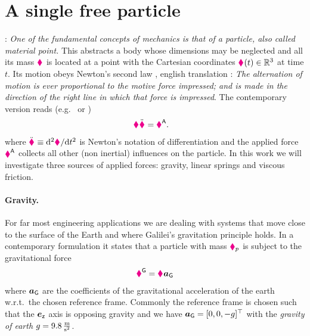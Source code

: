 \section{A single free particle}
\cite[§1]{Landau:Mechanics}: \textit{One of the fundamental concepts of mechanics is that of a \textit{particle}, also called material point.}
This abstracts a body whose dimensions may be neglected and all its mass $\textcolor{magenta}{\blacklozenge}_{}$ is located at a point with the Cartesian coordinates $\boldsymbol{\textcolor{magenta}{\blacklozenge}}_{}(t)\in\mathbb{R}^3$ at time $t$.
Its motion obeys Newton's second law \cite[p.\ 13, lex II]{Newton:Principia}, english translation \cite[p.\ 83]{Newton:PrincipiaEnglish}: \textit{The alternation of motion is ever proportional to the motive force impressed; and is made in the direction of the right line in which that force is impressed}. 
The contemporary version reads (e.g.\ \cite[eq.\ 6.1.1]{Lurie:AnalyticalMechanics} or \cite[eq.\ 1.3]{Goldstein:ClassicalMechanics})
\begin{align}\label{eq:NewtonsSecondLaw}
 \textcolor{magenta}{\blacklozenge}_{} \ddot{\boldsymbol{\textcolor{magenta}{\blacklozenge}}}_{} &= \boldsymbol{\textcolor{magenta}{\blacklozenge}}_{}^{\mathsf{A}}.
\end{align}
where $\ddot{\boldsymbol{\textcolor{magenta}{\blacklozenge}}}_{} \equiv \mathrm{d}^2 \boldsymbol{\textcolor{magenta}{\blacklozenge}}_{} / \mathrm{d} t^2$ is Newton's notation of differentiation and the applied force $\boldsymbol{\textcolor{magenta}{\blacklozenge}}_{}^{\mathsf{A}}$ collects all other (non inertial) influences on the particle.
In this work we will investigate three sources of applied forces: gravity, linear springs and viscous friction.

\paragraph{Gravity.}
For far most engineering applications we are dealing with systems that move close to the surface of the Earth and where Galilei's gravitation principle \cite[Day 3]{Galileo:TwoNewSciences} holds.
In a contemporary formulation it states that a particle with mass $\textcolor{magenta}{\blacklozenge}_{p}$ is subject to the gravitational force
\begin{align}\label{eq:ParticleGravity}
 \boldsymbol{\textcolor{magenta}{\blacklozenge}}_{}^{\mathsf{G}} = \textcolor{magenta}{\blacklozenge}_{} \boldsymbol{a}_{\mathsf{G}}
\end{align}
where $\boldsymbol{a}_{\mathsf{G}}$ are the coefficients of the gravitational acceleration of the earth w.r.t.\ the chosen reference frame.
Commonly the reference frame is chosen such that the $\boldsymbol{e}_{\mathsf{z}}$ axis is opposing gravity and we have $\boldsymbol{a}_{\mathsf{G}} = [0,0,-g]^\top$ with the \textit{gravity of earth} $g = 9.8\,\tfrac{\text{m}}{\text{s}^2}$.

